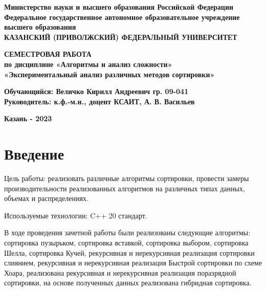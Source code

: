 \documentclass[a4paper, 14pt]{report}
\begin{document}
\begin{titlepage}

\linespread{1.5}
\begin{center}

\textbf{Министерство науки и высшего образования Российской Федерации
Федеральное государственное автономное образовательное учреждение высшего образования\\ {\large КАЗАНСКИЙ (ПРИВОЛЖСКИЙ) ФЕДЕРАЛЬНЫЙ УНИВЕРСИТЕТ}}


\vspace{1cm}

\vspace*{\fill}

\textbf{{\LARGE \textbf{СЕМЕСТРОВАЯ РАБОТА}}\\
по дисциплине «Алгоритмы и анализ сложности»\\{\tiny {\large {\tiny }}}
«Экспериментальный анализ различных методов сортировки»}


\vspace{1.5cm}

\begin{flushleft}
    \textbf{\large Обучающийся: Величко Кирилл Андреевич гр. 09-041}\\
    \textbf{\large Руководитель: к.ф.-м.н., доцент КСАИТ, А. В. Васильев}
\end{flushleft}


\vspace*{\fill}
\textbf{\large Казань - 2023}

\vfill

\end{center}

\end{titlepage}

\tableofcontents
\section{Введение}
Цель работы: реализовать различные алгоритмы сортировки, провести замеры производительности реализованных алгоритмов
 на различных типах данных, объемах и распределениях.
 
Используемые технологии: C++ 20 стандарт.
 
В ходе проведения зачетной работы были реализованы следующие алгоритмы: сортировка пузырьком, сортировка вставкой, сортировка выбором, сортировка Шелла,
сортировка Кучей, рекурсивная и нерекурсивная реализация сортировки слиянием, рекурсивная и нерекурсивная реализация Быстрой сортировки по схеме Хоара,
реализована рекурсивная и нерекурсивная реализация поразрядной сортировки, на основе полученных данных реализована гибридная сортировка.
\end{document}
